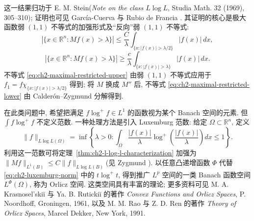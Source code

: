 这一结果归功于 E. M. Stein(\emph{Note on the class $L\log L$}, Studia Math. 32 (1969), 305--310); 证明也可见 García-Cuerva 与 Rubio de Francia . 其证明的核心是极大函数弱 $(1,1)$ 不等式的加强形式及“反向”弱 $(1,1)$ 不等式:
\begin{equation}
\label{eq:ch2-maximal-restricted-upper}
 |\{x\in\mathbb R^n:Mf(x)>\lambda\}|\le\frac C\lambda\int_{\{x:|f(x)|>\lambda/2\}}|f(x)|\,dx,
\end{equation}
\begin{equation}
\label{eq:ch2-maximal-restricted-lower}
 |\{x\in\mathbb R^n:Mf(x)>\lambda\}|\ge\frac c\lambda\int_{\{x:|f(x)|>\lambda\}}|f(x)|\,dx.
\end{equation}
不等式 \eqref{eq:ch2-maximal-restricted-upper} 由弱 $(1,1)$ 不等式应用于 $f_1=f\chi_{\{x:|f(x)|>\lambda/2\}}$ 得到; 将 $M$ 换成 $M''$ 后, 不等式 \eqref{eq:ch2-maximal-restricted-lower} 由 Calderón--Zygmund 分解得到.

在此类问题中, 希望把满足 $f\log^+f\in L^1$ 的函数视为某个 Banach 空间的元素. 但 $\int f\log^+f$ 不定义范数. 一种处理方法是引入 Luxemburg 范数: 给定 $\Omega\subset\mathbb R^n$, 定义
\begin{equation}
\label{eq:ch2-luxemburg-norm}
 \|f\|_{L\log L(\Omega)}=\inf\left\{\lambda>0:\int_\Omega\frac{|f(x)|}{\lambda}\log^+\left(\frac{|f(x)|}{\lambda}\right)dx\le1\right\}.
\end{equation}
利用这一范数可将定理~\ref{thm:ch2-l-log-l-characterization} 加强为 $\|Mf\|_{L^1(B)}\le C\|f\|_{L\log L(B)}$(见 Zygmund ). 以任意凸递增函数 $\Phi$ 代替 \eqref{eq:ch2-luxemburg-norm} 中的 $t\log^+t$, 得到推广 $L^p$ 空间的一类 Banach 函数空间 $L^\Phi(\Omega)$, 称为 Orlicz 空间. 这类空间具有丰富的理论; 更多资料可见 M. A. Krasnosel'skiĭ 与 Ya. B. Rutickiĭ 的著作 \emph{Convex Functions and Orlicz Spaces}, P. Noordhoff, Groningen, 1961, 以及 M. M. Rao 与 Z. D. Ren 的著作 \emph{Theory of Orlicz Spaces}, Marcel Dekker, New York, 1991.

\hypertarget{chapter-02-page-055}{}
